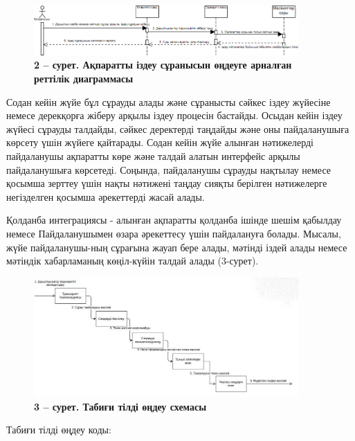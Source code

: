 \begin{figure}[H]
	\centering
	\includegraphics[width=0.9\textwidth]{assets/143}
	\caption*{\bfseries 2 -- сурет. Ақпаратты іздеу сұранысын өңдеуге арналған реттілік
  диаграммасы}
\end{figure}


\begin{multicols}{2}
Содан кейін жүйе бұл сұрауды алады және сұранысты сәйкес іздеу жүйесіне
немесе дерекқорға жіберу арқылы іздеу процесін бастайды. Осыдан кейін
іздеу жүйесі сұрауды талдайды, сәйкес деректерді таңдайды және оны
пайдаланушыға көрсету үшін жүйеге қайтарады. Содан кейін жүйе алынған
нәтижелерді пайдаланушы ақпаратты көре және талдай алатын интерфейс
арқылы пайдаланушыға көрсетеді. Соңында, пайдаланушы сұрауды нақтылау
немесе қосымша зерттеу үшін нақты нәтижені таңдау сияқты берілген
нәтижелерге негізделген қосымша әрекеттерді жасай алады.

Қолданба интеграциясы - алынған ақпаратты қолданба ішінде шешім қабылдау
немесе Пайдаланушымен өзара әрекеттесу үшін пайдалануға болады. Мысалы,
жүйе пайдаланушы-ның сұрағына жауап бере алады, мәтінді іздей алады
немесе мәтіндік хабарламаның көңіл-күйін талдай алады (3-сурет).
\end{multicols}


\begin{figure}[H]
	\centering
	\includegraphics[width=0.9\textwidth]{assets/144}
	\caption*{\bfseries 3 -- сурет. Табиғи тілді өңдеу схемасы}
\end{figure}



\begin{multicols}{2}
Табиғи тілді өңдеу коды:
\end{multicols}

